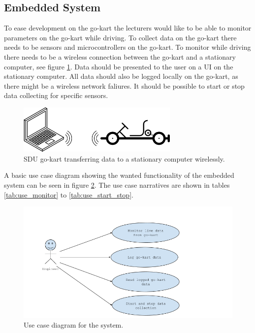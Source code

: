 \subsection{Embedded System}
To ease development on the go-kart the lecturers would like to be able to monitor parameters on the go-kart while driving.
To collect data on the go-kart there needs to be sensors and microcontrollers on the go-kart.
To monitor while driving there needs to be a wireless connection between the go-kart and a stationary computer, see figure \ref{fig:simple}.
Data should be presented to the user on a UI on the stationary computer.
All data should also be logged locally on the go-kart, as there might be a wireless network faliures. 
It should be possible to start or stop data collecting for specific sensors.
\begin{figure}[h]
 	\centering
    \includegraphics[width=0.7\textwidth]{graphics/go_kart_network_simple}
    \caption{SDU go-kart transferring data to a stationary computer wirelessly.}
    \label{fig:simple}
\end{figure}

A basic use case diagram showing the wanted functionality of the embedded system can be seen in figure \ref{fig:use_cases}.
The use case narratives are shown in tables \ref{tab:use_monitor} to \ref{tab:use_start_stop}.


\begin{figure}[h]
 	\centering
    \includegraphics[width=1\textwidth]{graphics/use_cases.png}
    \caption{Use case diagram for the system.}
    \label{fig:use_cases}
\end{figure}


